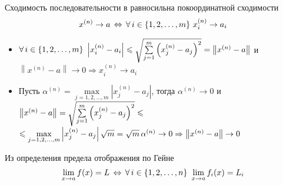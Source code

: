 \begin{utv}[https://www.youtube.com/live/46TKmI9S1Nw?si=NM7QKNlkedLtg16C&t=6749]\label{покоорд.сход.}
	Сходимость последовательности в {\small\rmm} равносильна покоординатной сходимости
	\[x^{(n)} \to a \, \Leftrightarrow \, \forall \, i \in \{1, 2, \dots, m\}\ x^{(n)}_i \to a_i\]
\end{utv} %

\begin{prf} %
	\begin{itemize}
		\item[\rproof] {\small $\forall \, i \in \{1, 2, \dots, m\}$} 
		$\left|x^{(n)}_i - a_i\right| \leqslant \sqrt{\sum\limits_{j=1}^m \left(x^{(n)}_j - a_j\right)^2}
		= \left\|x^{(n)} - a\right\|$ и $\left\|x^{(n)} - a\right\| \to 0 
		\Rightarrow x^{(n)}_i \to a_i$
		
		\item[\lproof] Пусть $\alpha^{(n)} =\max\limits_{j=1, 2, \dots, m} \left|x_j^{(n)} - a_j\right|$, 
		тогда $\alpha^{(n)} \to 0$
		и $\left\|x^{(n)} - a\right\| 
		= \sqrt{\sum\limits_{j=1}^m \left(x^{(n)}_j - a_j\right)^2} 
		\leqslant$\linebreak$\leqslant \max\limits_{j=1, 2, \dots, m} \left|x_j^{(n)} - a_j\right| \sqrt{m} 
		= \sqrt{m}\, \alpha^{(n)} \to 0 
		\Rightarrow \left\|x^{(n)} - a\right\| \to 0$ 
	\end{itemize}
\end{prf} %

\begin{slv}[https://www.youtube.com/live/46TKmI9S1Nw?si=ijDDMXWDNAVdX70b&t=7070] %
	Из определения предела отображения по Гейне 
	\[\lim_{x \to a}f(x) = L\, \Leftrightarrow \, \forall \, i \in \{1, 2, \dots, n\}\ \lim_{x \to a}f_i(x) = L_i\]
\end{slv} %

\pagebreak

